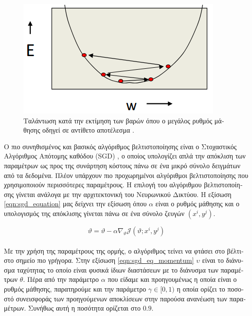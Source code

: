 \begin{figure}[H]
 \centering
 \includegraphics[scale=0.5]{Images/sgd_img}
 \caption[\textgreek{Ενέργεια Συνάρτησης Κόστους}]{\textgreek{Ταλάντωση κατά την εκτίμηση των βαρών όπου ο μεγάλος ρυθμός μάθησης οδηγεί σε αντίθετο αποτέλεσμα} \cite{coursera_nn}.}
 \label{fig:sgd_regime}
\end{figure}


\textgreek{Ο πιο συνηθισμένος και βασικός αλγόριθμος βελτιστοποίησης είναι ο Στοχαστικός Αλγόριθμος Απότομης καθόδου} (SGD) \cite{sgd}, \textgreek{ο οποίος υπολογίζει απλά την απόκλιση των παραμέτρων ως προς της συνάρτηση κόστους πάνω σε ένα μικρό σύνολο δειγμάτων από τα δεδομένα. Πλέον υπάρχουν πιο προχωρημένοι αλγόριθμοι βελτιστοποίησης που χρησιμοποιούν περισσότερες παραμέτρους. Η επιλογή του αλγόριθμου βελτιστοποίησης γίνεται ανάλογα με την αρχιτεκτονική του Νευρωνικού Δικτύου. Η εξίσωση} \ref{eqn:sgd_equation} \textgreek{μας δείχνει την εξίσωση όπου $\alpha$ είναι ο ρυθμός μάθησης και ο υπολογισμός της απόκλισης γίνεται πάνω σε ένα σύνολο ζευγών} $(x^{i},y^{j})$.
 

\begin{equation}
\label{eqn:sgd_equation}
 \vartheta = \vartheta - \alpha \nabla_{\vartheta}\mathit{\mathcal{J}(\vartheta;x^{i},y^{j})}
\end{equation}\\


\textgreek{Με την χρήση της παραμέτρους της ορμής, ο αλγόριθμος τείνει να φτάσει στο βέλτιστο σημείο πιο γρήγορα. Στην εξίσωση }\ref{eqn:sgd_eq_momentum} $\upsilon$ \textgreek{είναι το διάνυσμα ταχύτητας το οποίο είναι φυσικά ίδιων διαστάσεων με το διάνυσμα των παραμέτρων }$\theta$. \textgreek{Πέρα από την παράμετρο }$\alpha$ \textgreek{που είδαμε και προηγουμένως η οποία είναι ο ρυθμός μάθησης, παρατηρούμε και την παράμετρο }$\gamma \in [0,1)$ \textgreek{η οποία ορίζει το ποσοστό συνεισφοράς των προηγούμενων αποκλίσεων στην παρούσα ανανέωση των παραμέτρων. Συνήθως αυτή η ποσότητα ορίζεται στο $0.9$.} 

